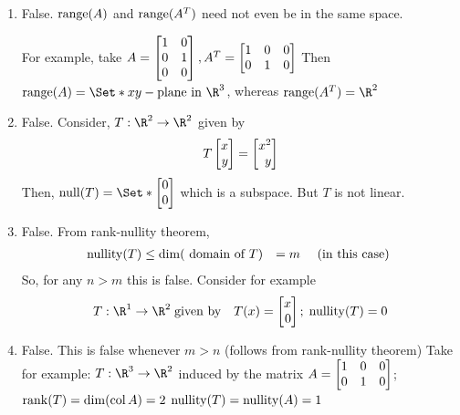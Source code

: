 \begin{exercises}
\begin{problist}
		\begin{solution}

			\begin{enumerate}
				\item False. $\operatorname{range}(A)$ and $\operatorname{range}(A^{T})$ need not even
					be in the same space.

					For example, take $A=\mat{1&0\\0&1\\0&0}, A^{T}=\mat{1&0&0\\0&1&0}$
					Then $\Range(A)=\Set*{xy-\text{plane in }\R^3}$,
					whereas $\Range(A^{T})=\R^{2}$

				\item False. Consider, $T:\R^{2}\to\R^{2}$ given by
					\[
						T\mat{x\\y}=\mat{x^2\\y}
					\]
					 Then, $\Null(T)= \Set*{\mat{0\\0}}$ which is a subspace.
					But $T$ is not linear.

				\item False. From rank-nullity theorem,
					\begin{align*}
						\operatorname{nullity}(T) & \leq \operatorname{dim}(\text{ domain of }T) & =m \quad \text{ (in this case) }
					\end{align*}So, for any $n>m$ this is false. Consider
					for example
					\begin{align*}
						 & T:\R^{1}\to\R^{2}\;\text{given by} & T(x)=\mat{x\\0};\; \Nullity(T)=0
					\end{align*}

				\item False. This is false whenever $m>n$ (follows from rank-nullity
					theorem) Take for example: $T:\R^{3}\to\R^{2}$ induced
					by the matrix $A=\mat{1&0&0\\0&1&0}$;\\ $\operatorname{rank}(T)=\operatorname{dim}(\operatorname{col}
					A)=2$ $\operatorname{nullity}(T) = \operatorname{nullity}(A)=1$
			\end{enumerate}
		\end{solution}
	\end{problist}
\end{exercises}